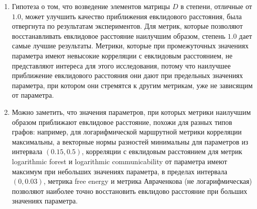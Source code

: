 \begin{enumerate}
\newpage 
\item Гипотеза о том, что возведение элементов матрицы $D$ в степени, отличные от $1.0$, может улучшить качество приближения евклидового расстояния, была отвергнута по результатам экспериментов. Для метрик, которые позволяют восстанавливать евклидовое расстояние наилучшим образом, степень $1.0$ дает самые лучшие результаты. Метрики, которые при промежуточных значениях параметра имеют невысокие корреляции с евклидовым расстоянием, не представляют интереса для этого исследования, потому что наилучшее приближение евклидового расстояния они дают при предельных значениях параметра, при котором они стремятся к другим метрикам, уже не зависящим от параметра.

\item Можно заметить, что значения параметров, при которых метрики наилучшим образом приближают евклидовое расстояние, похожи для разных типов графов: например, для логарифмической маршрутной метрики корреляции максимальны, а векторные нормы разностей минимальны для параметров из интервала $(0.15, 0.5)$, корреляции с евклидовым расстоянием для метрик logarithmic forest и logarithmic communicability от параметра имеют максимум при небольших значениях параметра, в пределах интервала $(0, 0.03)$, метрика free energy и метрика Авраченкова (не логарифмическая) позволяют наиболее точно восстановить евклидово расстояние при больших значениях параметра.
\end{enumerate}
